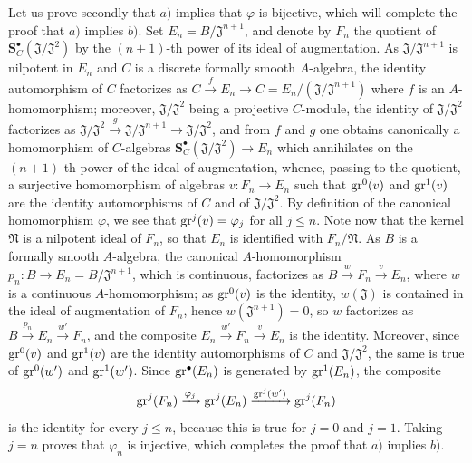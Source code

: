 \begin{env}[19.5.4.2]
\label{0.19.5.4.2}
Let us prove secondly that $a)$ implies that $\varphi$ is bijective, which will complete the proof that $a)$ implies $b)$.
Set $E_n=B/\mathfrak{J}^{n+1}$, and denote by $F_n$ the quotient of $\mathbf{S}_C^\bullet(\mathfrak{J}/\mathfrak{J}^2)$ by the $(n+1)$-th power of its ideal of augmentation.
As $\mathfrak{J}/\mathfrak{J}^{n+1}$ is nilpotent in $E_n$ and $C$ is a discrete formally smooth $A$-algebra, the identity automorphism of $C$ factorizes as $C\xrightarrow{f}E_n\to C=E_n/(\mathfrak{J}/\mathfrak{J}^{n+1})$ where $f$ is an $A$-homomorphism;
 moreover, $\mathfrak{J}/\mathfrak{J}^2$ being a projective $C$-module, the identity of $\mathfrak{J}/\mathfrak{J}^2$ factorizes as $\mathfrak{J}/\mathfrak{J}^2\xrightarrow{g}\mathfrak{J}/\mathfrak{J}^{n+1}\to\mathfrak{J}/\mathfrak{J}^2$, and from $f$ and $g$ one obtains canonically a homomorphism of $C$-algebras $\mathbf{S}_C^\bullet(\mathfrak{J}/\mathfrak{J}^2)\to E_n$ which annihilates on the $(n+1)$-th power of the ideal of augmentation, whence, passing to the quotient, a surjective homomorphism of algebras $v:F_n\to E_n$ such that $\operatorname{gr}^0(v)$ and $\operatorname{gr}^1(v)$ are the identity automorphisms of $C$ and of $\mathfrak{J}/\mathfrak{J}^2$.
By definition of the canonical homomorphism $\varphi$, we see that $\operatorname{gr}^j(v)=\varphi_j$ for all $j\leq n$.
Note now that the kernel $\mathfrak N$ is a nilpotent ideal of $F_n$, so that $E_n$ is identified with $F_n/\mathfrak N$.
As $B$ is a formally smooth $A$-algebra, the canonical $A$-homomorphism $p_n:B\to E_n=B/\mathfrak{J}^{n+1}$, which is continuous, factorizes as $B\xrightarrow{w}F_n\xrightarrow{v}E_n$, where $w$ is a continuous $A$-homomorphism;
as $\operatorname{gr}^0(v)$ is the identity, $w(\mathfrak{J})$ is contained in the ideal of augmentation of $F_n$, hence $w(\mathfrak{J}^{n+1})=0$,
so $w$ factorizes as $B\xrightarrow{p_n}E_n\xrightarrow{w'}F_n$, and the composite $E_n\xrightarrow{w'}F_n\xrightarrow{v}E_n$ is the identity.
Moreover, since $\operatorname{gr}^0(v)$ and $\operatorname{gr}^1(v)$ are the identity automorphisms of $C$ and $\mathfrak{J}/\mathfrak{J}^2$, the same is true of $\operatorname{gr}^0(w')$ and $\operatorname{gr}^1(w')$.
Since $\operatorname{gr}^\bullet(E_n)$ is generated by $\operatorname{gr}^1(E_n)$, the composite
\[
  \operatorname{gr}^j(F_n)\xrightarrow{\varphi_j}\operatorname{gr}^j(E_n)
  \xrightarrow{\operatorname{gr}^j(w')}\operatorname{gr}^j(F_n)
\]
is the identity for every $j\leq n$, because this is true for $j=0$ and $j=1$.
Taking $j=n$ proves that $\varphi_n$ is injective, which completes the proof that $a)$ implies $b)$.
\end{env}

